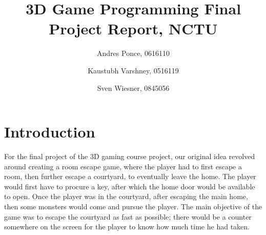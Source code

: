 \documentclass{article}
\author{ Andres Ponce, 0616110 \\
\and
Kaustubh Varshney, 0516119
\and
Sven Wiesner, 0845056
}
\title{3D Game Programming Final Project Report, NCTU}
\begin{document}
\maketitle
\section{Introduction}
For the final project of the 3D gaming course project, our original idea revolved around creating a 
room escape game, where the player had to first escape a room, then further escape a courtyard, to 
eventually leave the home. The player would first have to procure a key, after which the home door
would be available to open. Once the player was in the courtyard, after escaping the main home, then 
some monsters would come and pursue the player. The main objective of the game was to escape the 
courtyard as fast as possible; there would be a counter somewhere on the screen for the player to 
know how much time he had taken.
\end{document}
